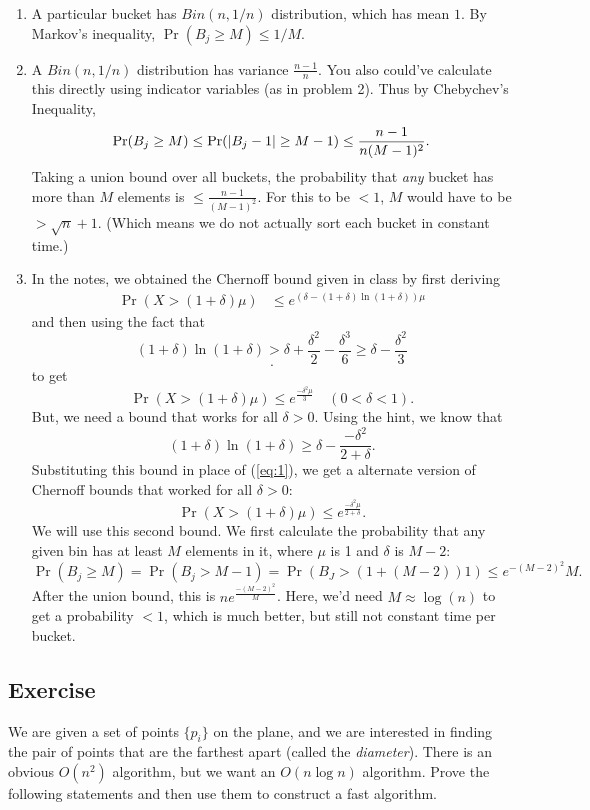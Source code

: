 \documentclass{article}
\newcounter{counter}
\newcommand{\Exercise}{Exercise \stepcounter{counter}\thecounter}
\DeclarePairedDelimiter\abs{\lvert}{\rvert}%
\begin{document}
{  \begin{enumerate}
    \item A particular bucket has $Bin(n,1/n)$ distribution, which has mean
      $1$. By Markov's inequality, $\Pr(B_j \geq M) \leq 1/M$.
    \item A $Bin(n,1/n)$ distribution has variance $\frac{n-1}{n}$. You also could've calculate this directly using indicator variables (as in problem 2).
      Thus by Chebychev's Inequality, $$\Pr(B_j \geq M) \leq \Pr(\abs{B_j - 1}
      \geq M-1) \leq \frac{n-1}{n(M-1)^2}.$$ Taking a union bound over all
      buckets, the probability that \emph{any} bucket has more than $M$
      elements is $\leq \frac{n-1}{(M-1)^2}$. For this to be $< 1$, $M$ would
      have to be $> \sqrt{n} +1$. (Which means we do not actually sort each
      bucket in constant time.)
    \item In the notes, we obtained the Chernoff bound given in class by first deriving
    $$\begin{aligned}
        \Pr{(X > (1 + \delta) \mu)} &\le e^{(\delta - (1 + \delta)\ln(1 + \delta))\mu}
    \end{aligned}$$
    and then using the fact that
    \begin{equation} \label{eq:1}
        (1 + \delta)\ln(1 + \delta) > \delta + \frac{\delta^{2}}{2} - \frac{\delta^{3}}{6} \ge \delta - \frac{\delta^{2}}{3}
    \end{equation}
    $$.$$ to get $$\Pr{(X > (1 + \delta) \mu)} \le e^{\frac{-\delta^{2}\mu}{3}}\quad (0 < \delta < 1).$$ But, we need a bound that works for all $\delta > 0$. Using the hint, we know that 
    $$(1 + \delta) \ln(1 + \delta) \ge \delta - \frac{-\delta^{2}}{2 + \delta}.$$ Substituting this bound in place of (\ref{eq:1}), we get a alternate version of Chernoff bounds that worked for all $\delta > 0$: $$\Pr(X > (1+\delta)\mu) \leq e^\frac{-\delta^2\mu}{2+\delta}.$$
    We will use this second bound. We first calculate the probability that any given bin has at least $M$ elements in it, where $\mu$ is 1 and $\delta$ is $M-2$: 
    $$\Pr(B_j \geq M) = \Pr( B_j > M-1) = \Pr(B_J > (1 + (M-2))1) \leq e^{-(M-2)^2}{M}.$$ After the union bound, this is
      $ne^\frac{-(M-2)^2}{M}$.  Here, we'd need $M \approx \log(n)$ to get a
      probability $< 1$, which is much better, but still not constant time per
      bucket.
  \end{enumerate}


\subsection*{\Exercise}
 We are given a set of points $\{p_i\}$ on the plane, and we are interested in finding the pair of points that are the farthest apart (called the {\em diameter}). There is an obvious $O(n^2)$ algorithm, but we want an $O(n\log n)$ algorithm.  Prove the following statements and then use them to construct a fast algorithm.

}
\end{document}
